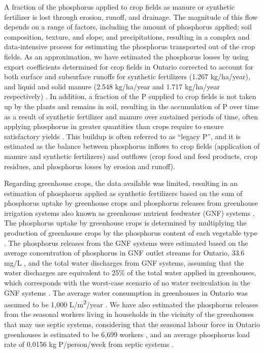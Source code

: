 \documentclass[authoryear]{elsarticle}
\begin{document}
A fraction of the phosphorus applied to crop fields as manure or synthetic fertilizer is lost through erosion, runoff, and drainage. The magnitude of this flow depends on a range of factors, including the amount of phosphorus applied; soil composition, texture, and slope; and precipitations, resulting in a complex and data-intensive process for estimating the phosphorus transported out of the crop fields. As an approximation, we have estimated the phosphorus losses by using export coefficients determined for crop fields in Ontario corrected to account for both surface and subsurface runoffs for synthetic fertilizers (1.267 kg/ha/year), and liquid and solid manure (2.548 kg/ha/year and 1.717 kg/ha/year respectively) \citep{zhang2015tile, wang2018solid,tan2011surface}. In addition, a fraction of the P supplied to crop fields is not taken up by the plants and remains in soil, resulting in the accumulation of P over time as a result of synthetic fertilizer and manure over sustained periods of time, often applying phosphorus in greater quantities than crops require to ensure satisfactory yields \citep{reid2019addressing}. This buildup is often referred to as “legacy P”, and it is estimated as the balance between phosphorus inflows to crop fields (application of manure and synthetic fertilizers) and outflows (crop food and feed products, crop residues, and phosphorus losses by erosion and runoff).

Regarding greenhouse crops, the data available was limited, resulting in an estimation of phosphorus applied as synthetic fertilizers based on the sum of phosphorus uptake by greenhouse crops
and phosphorus releases from greenhouse irrigation systems also known as greenhouse nutrient feedwater (GNF) systems \citep{GNFOntario}. The phosphorus uptake by greenhouse crops is determined by multiplying the production of greenhouse crops \citep{HorticulturalOntario} by the phosphorus content of each vegetable type \citep{USDAHandbook}. The phosphorus releases from the GNF systems were estimated based on the average concentration of phosphorus in GNF outlet streams for  Ontario, 33.6 mg/L \citep{GreenhouseReleases}, and the total water discharges from GNF systems, assuming that the water discharges are equivalent to 25\% of the total water applied in greenhouses, which corresponds with the worst-case scenario of no water recirculation in the GNF systems \citep{GNFOntario}. The average water consumption in greenhouses in Ontario was assumed to be 1,000 L/m\textsuperscript{2}/year \citep{GrowingVeggiesOntario}. We have also estimated the phosphorus releases from the seasonal workers living in households in the vicinity of the greenhouses that may use septic systems, considering that the seasonal labour force in Ontario greenhouses is estimated to be 6,699 workers \citep{GreenhouseWorkers}, and an average phosphorus load rate of 0.0156 kg P/person/week from septic systems \citep{oldfield2020estimation}.
\end{document}
